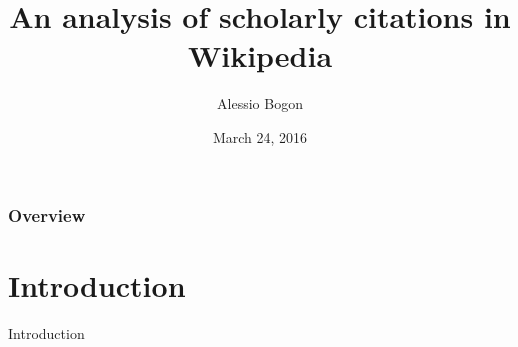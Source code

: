 \documentclass{beamer}
\title[Scholarly citations in Wikipedia]{An analysis of scholarly citations in Wikipedia} %
\author{Alessio Bogon} %
\institute[Unitn] %
{
University of Trento \\ %
Department of Information Engineering and Computer Science \\
\medskip
Master Degree in Computer Science
}
\date{March 24, 2016} %
\begin{document}
\begin{frame}
\titlepage %
\end{frame}

\begin{frame}
\frametitle{Overview} %
\tableofcontents %
\end{frame}


\section{Introduction} %
\begin{frame}[c]
\Huge{\centerline{Introduction}}
\end{frame}
\end{document}
